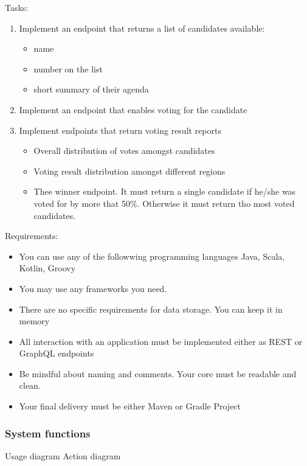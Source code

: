\documentclass[12pt,a4paper]{article}
\begin{document}
Tasks:
\begin{enumerate}
    \item
        Implement an endpoint that returns a list of candidates available:
        \begin{itemize}
            \item name
            \item number on the list
            \item short summary of their agenda
        \end{itemize}
    \item
        Implement an endpoint that enables voting for the candidate
    \item
        Implement endpoints that return voting result reports
        \begin{itemize}
            \item Overall distribution of votes amongst candidates
            \item Voting result distribution amongst different regions
            \item Thee winner endpoint. It must return a single candidate
                if he/she was voted for by more that 50\%. Otherwise
                it must return tho most voted candidates.
        \end{itemize}
\end{enumerate}

Requirements:
\begin{itemize}
    \item
        You can use any of the followwing programming languages Java, Scala, Kotlin, Groovy
    \item
        You may use any frameworks you need.
    \item
        There are no specific requirements for data storage. You can keep it in
        memory
    \item
        All interaction with an application must be implemented either as REST
        or GraphQL endpoints
    \item
        Be mindful about naming and comments. Your core must be readable and
        clean.
    \item
        Your final delivery must be either Maven or Gradle Project
\end{itemize}

\subsubsection{System functions}
Usage diagram
Action diagram
\end{document}
